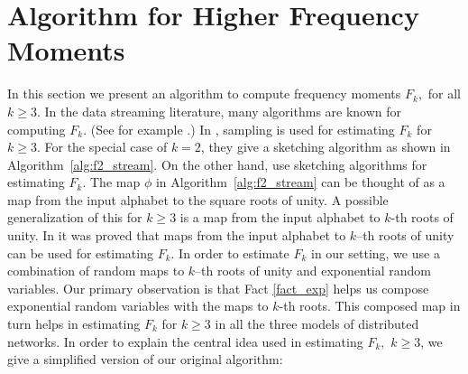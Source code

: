 \documentclass[10pt,twosided,a4paper,draft,onecolumn]{article}
\begin{document}
\section{Algorithm for Higher Frequency Moments}
\label{sec:Fk}

In this section we present an algorithm to compute frequency moments
$F_k,$ for all $k \geq 3.$ In the data streaming literature, many
algorithms are known for computing $F_k.$ (See for example
\cite{Alon96,Coppersmith04,Ganguly04}.) In \cite{Alon96}, sampling is
used for estimating $F_k$ for $k \geq 3$. For the special case of
$k=2$, they give a sketching algorithm as shown in
Algorithm~\ref{alg:f2_stream}. On the other hand,
\cite{Coppersmith04,Ganguly04} use sketching algorithms for estimating
$F_k$. The map $\phi$ in Algorithm~\ref{alg:f2_stream} can be thought
of as a map from the input alphabet to the square roots of unity. A
possible generalization of this for $k \geq 3$ is a map from the input
alphabet to $k$-th roots of unity. In \cite{Ganguly04} it was proved
that maps from the input alphabet to $k$--th roots of unity can be
used for estimating $F_k.$ In order to estimate $F_k$ in our setting,
we use a combination of random maps to $k$--th roots of unity and
exponential random variables. Our primary observation is that Fact
\ref{fact_exp} helps us compose exponential random variables with the
maps to $k$-th roots. This composed map in turn helps in estimating
$F_k$ for $k \geq 3$ in all the three models of distributed networks.
In order to explain the central idea used in estimating $F_k,$ $k \geq
3$, we give a simplified version of our original algorithm:
\end{document}
